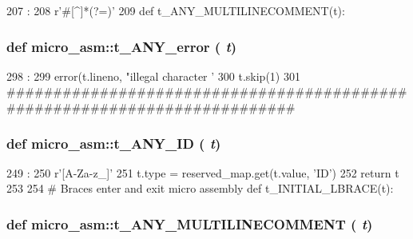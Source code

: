 \begin{DoxyCode}
207                     :
208     r'\#[^\n]*(?=\n)'
209 
def t_ANY_MULTILINECOMMENT(t):
\end{DoxyCode}
\hypertarget{namespacemicro__asm_a8a27a0ed21dc2158cf69643547032d6c}{
\subsubsection[{t\_\-ANY\_\-error}]{\setlength{\rightskip}{0pt plus 5cm}def micro\_\-asm::t\_\-ANY\_\-error ( {\em t})}}
\label{namespacemicro__asm_a8a27a0ed21dc2158cf69643547032d6c}



\begin{DoxyCode}
298                   :
299     error(t.lineno, "illegal character '%
300     t.skip(1)
301 
##########################################################################
\end{DoxyCode}
\hypertarget{namespacemicro__asm_a8bd1b1ba139acf81145c33e6585aae5d}{
\subsubsection[{t\_\-ANY\_\-ID}]{\setlength{\rightskip}{0pt plus 5cm}def micro\_\-asm::t\_\-ANY\_\-ID ( {\em t})}}
\label{namespacemicro__asm_a8bd1b1ba139acf81145c33e6585aae5d}



\begin{DoxyCode}
249                :
250     r'[A-Za-z_]\w*'
251     t.type = reserved_map.get(t.value, 'ID')
252     return t
253 
254 # Braces enter and exit micro assembly
def t_INITIAL_LBRACE(t):
\end{DoxyCode}
\hypertarget{namespacemicro__asm_a8f356658252996771cbfeff5f1e22598}{
\subsubsection[{t\_\-ANY\_\-MULTILINECOMMENT}]{\setlength{\rightskip}{0pt plus 5cm}def micro\_\-asm::t\_\-ANY\_\-MULTILINECOMMENT ( {\em t})}}
\label{namespacemicro__asm_a8f356658252996771cbfeff5f1e22598}



